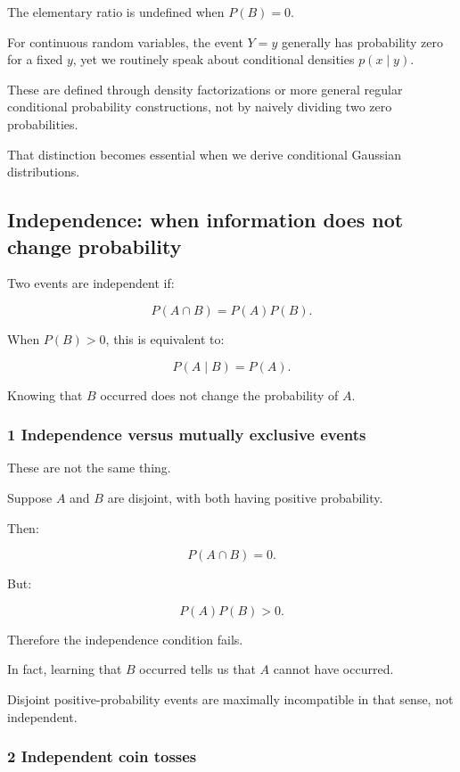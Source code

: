 The elementary ratio is undefined when \(P(B)=0\).

For continuous random variables, the event \(Y=y\) generally has probability zero for a fixed \(y\), yet we routinely speak about conditional densities \(p(x\mid y)\).

These are defined through density factorizations or more general regular conditional probability constructions, not by naively dividing two zero probabilities.

That distinction becomes essential when we derive conditional Gaussian distributions.

\subsection{Independence: when information does not change probability}\label{02-foundations-ii-ch023-independence-when-information-does-not-change-probability}

Two events are independent if:

\[
 \boxed{ P(A\cap B)=P(A)P(B) }.
\]

When \(P(B)>0\), this is equivalent to:

\[
 P(A\mid B)=P(A).
\]

Knowing that \(B\) occurred does not change the probability of \(A\).

\subsubsection{1 Independence versus mutually exclusive events}\label{02-foundations-ii-ch023-independence-versus-mutually-exclusive-events}

These are not the same thing.

Suppose \(A\) and \(B\) are disjoint, with both having positive probability.

Then:

\[
 P(A\cap B)=0.
\]

But:

\[
 P(A)P(B)>0.
\]

Therefore the independence condition fails.

In fact, learning that \(B\) occurred tells us that \(A\) cannot have occurred.

Disjoint positive-probability events are maximally incompatible in that sense, not independent.

\subsubsection{2 Independent coin tosses}\label{02-foundations-ii-ch023-independent-coin-tosses}


